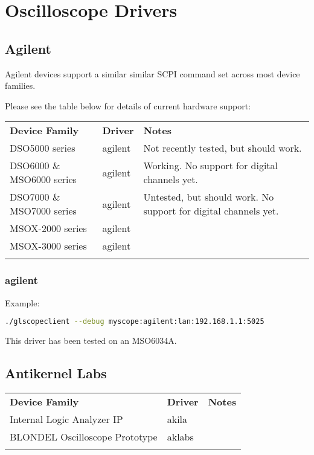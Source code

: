 \chapter{Oscilloscope Drivers}
\label{sec:drivers}

\section{Agilent}

Agilent devices support a similar similar SCPI command set across most device families.

Please see the table below for details of current hardware support:

\begin{tabularx}{16cm}{llX}
\thickhline
\textbf{Device Family} & \textbf{Driver} & \textbf{Notes} \\
\thickhline
DSO5000 series & agilent & Not recently tested, but should work.\\
\thickhline
DSO6000 \& MSO6000 series & agilent &  Working. No support for digital channels yet.\\
\thickhline
DSO7000 \& MSO7000 series & agilent &  Untested, but should work. No support for digital channels yet.\\
\thickhline
MSOX-2000 series & agilent &  \\
\thickhline
MSOX-3000 series & agilent &  \\
\thickhline
\end{tabularx}

\subsection{agilent}

Example:
\begin{lstlisting}[language=sh]
./glscopeclient --debug myscope:agilent:lan:192.168.1.1:5025
\end{lstlisting}

This driver has been tested on an MSO6034A.

\section{Antikernel Labs}

\begin{tabularx}{16cm}{llX}
\thickhline
\textbf{Device Family} & \textbf{Driver} & \textbf{Notes} \\
\thickhline
Internal Logic Analyzer IP & akila & \\
\thickhline
BLONDEL Oscilloscope Prototype & aklabs & \\
\thickhline
\end{tabularx}

